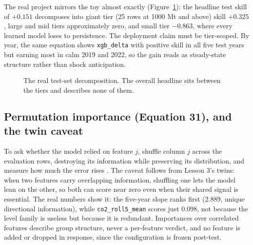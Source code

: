 \documentclass[11pt]{article}
\begin{document}
The real project mirrors the toy almost exactly
(Figure~\ref{fig:tiers}): the headline test skill of $+0.151$ decomposes
into giant tier (25 rows at 1000 Mt and above) skill $+0.325$, large and
mid tiers approximately zero, and small tier $-0.863$, where every
learned model loses to persistence. The deployment claim must be
tier-scoped. By year, the same equation shows \texttt{xgb\_delta} with
positive skill in all five test years but earning most in calm 2019 and
2022, so the gain reads as steady-state structure rather than shock
anticipation.

\begin{figure}[ht]
\centering
{}
\caption{The real test-set decomposition. The overall headline sits
between the tiers and describes none of them.}
\label{fig:tiers}
\end{figure}

\subsection{Permutation importance (Equation 31), and the twin caveat}

To ask whether the model relied on feature $j$, shuffle column $j$ across
the evaluation rows, destroying its information while preserving its
distribution, and measure how much the error rises
\cite{breiman2001random}. The caveat follows from Lesson 3's twins: when
two features carry overlapping information, shuffling one lets the model
lean on the other, so both can score near zero even when their shared
signal is essential. The real numbers show it: the five-year slope ranks
first (2.889, unique directional information), while
\texttt{co2\_roll5\_mean} scores just 0.098, not because the level family
is useless but because it is redundant. Importances over correlated
features describe group structure, never a per-feature verdict, and no
feature is added or dropped in response, since the configuration is
frozen post-test.
\end{document}
